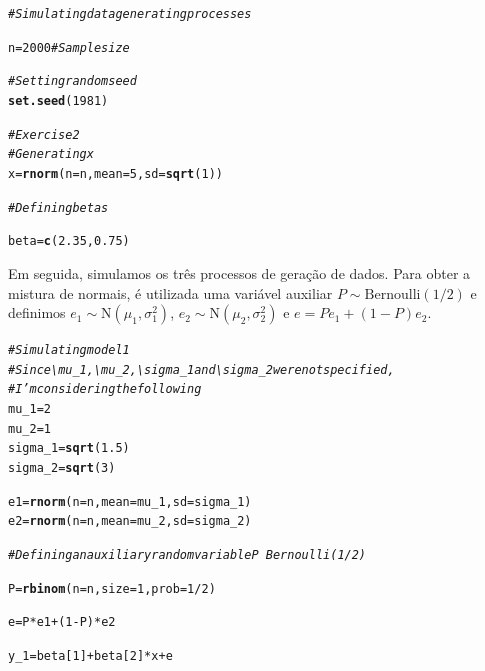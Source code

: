 \documentclass{homework}\usepackage[]{graphicx}\usepackage[]{color}
\makeatletter
\newcommand{\hlnum}[1]{\textcolor[rgb]{0.686,0.059,0.569}{#1}}%
\newcommand{\hlcom}[1]{\textcolor[rgb]{0.678,0.584,0.686}{\textit{#1}}}%
\newcommand{\hlopt}[1]{\textcolor[rgb]{0,0,0}{#1}}%
\newcommand{\hlstd}[1]{\textcolor[rgb]{0.345,0.345,0.345}{#1}}%
\newcommand{\hlkwb}[1]{\textcolor[rgb]{0.69,0.353,0.396}{#1}}%
\newcommand{\hlkwc}[1]{\textcolor[rgb]{0.333,0.667,0.333}{#1}}%
\newcommand{\hlkwd}[1]{\textcolor[rgb]{0.737,0.353,0.396}{\textbf{#1}}}%
\newenvironment{kframe}{%
 \def\at@end@of@kframe{}%
 \ifinner\ifhmode%
  \def\at@end@of@kframe{\end{minipage}}%
  \begin{minipage}{\columnwidth}%
 \fi\fi%
 \def\FrameCommand##1{\hskip\@totalleftmargin \hskip-\fboxsep
 \colorbox{shadecolor}{##1}\hskip-\fboxsep
     \hskip-\linewidth \hskip-\@totalleftmargin \hskip\columnwidth}%
 \MakeFramed {\advance\hsize-\width
   \@totalleftmargin\z@ \linewidth\hsize
   \@setminipage}}%
 {\par\unskip\endMakeFramed%
 \at@end@of@kframe}
\newenvironment{knitrout}{}{} %
\makeatother
\begin{document}
\begin{knitrout}
\color{fgcolor}\begin{kframe}
\begin{alltt}
\hlcom{# Simulating data generating processes}

\hlstd{n} \hlkwb{=} \hlnum{2000} \hlcom{# Sample size}

\hlcom{# Setting random seed}
\hlkwd{set.seed}\hlstd{(}\hlnum{1981}\hlstd{)}

\hlcom{# Exercise 2}
\hlcom{# Generating x}
\hlstd{x} \hlkwb{=} \hlkwd{rnorm}\hlstd{(}\hlkwc{n} \hlstd{= n,} \hlkwc{mean} \hlstd{=} \hlnum{5}\hlstd{,} \hlkwc{sd} \hlstd{=} \hlkwd{sqrt}\hlstd{(}\hlnum{1}\hlstd{))}

\hlcom{# Defining betas}

\hlstd{beta} \hlkwb{=} \hlkwd{c}\hlstd{(}\hlnum{2.35}\hlstd{,} \hlnum{0.75}\hlstd{)}
\end{alltt}
\end{kframe}
\end{knitrout}

Em seguida, simulamos os três processos de geração de dados. Para obter a mistura de normais, é utilizada uma variável auxiliar $P \sim \mathrm{Bernoulli}(1/2)$ e definimos $e_1 \sim \mathrm{N}(\mu_1, \sigma_1^2)$, $e_2 \sim \mathrm{N}(\mu_2, \sigma_2^2)$ e $e = Pe_1 + (1-P)e_2$.

\begin{knitrout}
\color{fgcolor}\begin{kframe}
\begin{alltt}
\hlcom{# Simulating model 1}
\hlcom{# Since \textbackslash{}mu_1, \textbackslash{}mu_2, \textbackslash{}sigma_1 and \textbackslash{}sigma_2 were not specified,}
\hlcom{# I'm considering the following}
\hlstd{mu_1} \hlkwb{=} \hlnum{2}
\hlstd{mu_2} \hlkwb{=} \hlnum{1}
\hlstd{sigma_1} \hlkwb{=} \hlkwd{sqrt}\hlstd{(}\hlnum{1.5}\hlstd{)}
\hlstd{sigma_2} \hlkwb{=} \hlkwd{sqrt}\hlstd{(}\hlnum{3}\hlstd{)}

\hlstd{e1} \hlkwb{=} \hlkwd{rnorm}\hlstd{(}\hlkwc{n} \hlstd{= n,} \hlkwc{mean} \hlstd{= mu_1,} \hlkwc{sd} \hlstd{= sigma_1)}
\hlstd{e2} \hlkwb{=} \hlkwd{rnorm}\hlstd{(}\hlkwc{n} \hlstd{= n,} \hlkwc{mean} \hlstd{= mu_2,} \hlkwc{sd} \hlstd{= sigma_2)}

\hlcom{# Defining an auxiliary random variable P ~ Bernoulli(1/2)}

\hlstd{P} \hlkwb{=} \hlkwd{rbinom}\hlstd{(}\hlkwc{n} \hlstd{= n,} \hlkwc{size} \hlstd{=} \hlnum{1}\hlstd{,} \hlkwc{prob} \hlstd{=} \hlnum{1}\hlopt{/}\hlnum{2}\hlstd{)}

\hlstd{e} \hlkwb{=} \hlstd{P} \hlopt{*} \hlstd{e1} \hlopt{+} \hlstd{(}\hlnum{1}\hlopt{-}\hlstd{P)} \hlopt{*} \hlstd{e2}

\hlstd{y_1} \hlkwb{=} \hlstd{beta[}\hlnum{1}\hlstd{]} \hlopt{+} \hlstd{beta[}\hlnum{2}\hlstd{]} \hlopt{*} \hlstd{x} \hlopt{+} \hlstd{e}
\end{alltt}
\end{kframe}
\end{knitrout}
\end{document}
